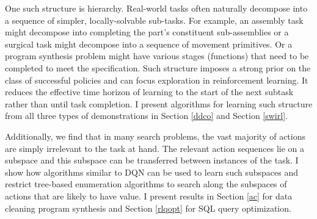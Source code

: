 One such structure is hierarchy.
Real-world tasks often naturally decompose into a sequence of simpler, locally-solvable sub-tasks.
For example, an assembly task might decompose into completing the part's constituent sub-assemblies or a surgical task might decompose into a sequence of movement primitives.
Or a program synthesis problem might have various stages (functions) that need to be completed to meet the specification.
Such structure imposes a strong prior on the class of successful policies and can focus exploration in reinforcement learning.
It reduces the effective time horizon of learning to the start of the next subtask rather than until task completion.
I present algorithms for learning such structure from all three types of demonstrations in Section \ref{ddco} and Section \ref{swirl}.

Additionally, we find that in many search problems, the vast majority of actions are simply irrelevant to the task at hand. The relevant action sequences lie on a subspace and this subspace can be transferred between instances of the task. I show how algorithms similar to DQN can be used to learn such subspaces and restrict tree-based enumeration algorithms to search along the subspaces of actions that are likely to have value. I present results in Section \ref{ac} for data cleaning program synthesis and Section \ref{rlqopt} for SQL query optimization.



